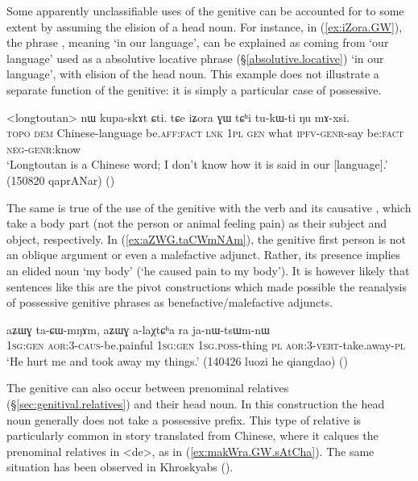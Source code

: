 Some apparently unclassifiable uses of the genitive can be accounted for to some extent by assuming the elision of a head noun.  For instance, in (\ref{ex:iZora.GW}), the phrase , meaning `in our language', can be explained as coming from  `our language' used as a absolutive locative phrase (§\ref{absolutive.locative}) `in our language', with elision of the head noun. This example does not illustrate a separate function of the genitive: it is simply a particular case of possessive.

\begin{exe}
\ex \label{ex:iZora.GW}
\gll  <longtoutan> nɯ kupa-skɤt ɕti. tɕe iʑora ɣɯ tɕʰi tu-kɯ-ti ŋu mɤ-xsi. \\
\textsc{topo} \textsc{dem} Chinese-language be.\textsc{aff}:\textsc{fact} \textsc{lnk} \textsc{1pl} \textsc{gen} what \textsc{ipfv}-\textsc{genr}-say be:\textsc{fact} \textsc{neg}-\textsc{genr}:know \\
\glt `Longtoutan is a Chinese word; I don't know how it is said in our [language].'  (150820 qaprANar)
()
\end{exe}

The same is true of the use of the genitive with the verb  and its causative , which take a body part (not the person or animal feeling pain) as their subject and object, respectively. In (\ref{ex:aZWG.taCWmNAm}), the genitive first person  is not an oblique argument or even a malefactive adjunct. Rather, its presence implies an elided noun  `my body' (`he caused pain to my body'). It is however likely that sentences like this are the pivot constructions which made possible the reanalysis of possessive genitive phrases as benefactive/malefactive adjuncts.

\begin{exe}
\ex \label{ex:aZWG.taCWmNAm}
\gll aʑɯɣ ta-ɕɯ-mŋɤm, aʑɯɣ a-laχtɕʰa ra ja-nɯ-tsɯm-nɯ \\
\textsc{1sg}:\textsc{gen} \textsc{aor}:3\flobv{}-\textsc{caus}-be.painful \textsc{1sg}:\textsc{gen} \textsc{1sg}.\textsc{poss}-thing \textsc{pl} \textsc{aor}:3\flobv{}-\textsc{vert}-take.away-\textsc{pl} \\
\glt `He hurt me and took away my things.' (140426 luozi he qiangdao) 	()
\end{exe}

The genitive can also occur between prenominal relatives (§\ref{sec:genitival.relatives}) and their head noun. In this construction the head noun generally does not take a possessive prefix. This type of relative is particularly common in story translated from Chinese, where it calques the prenominal relatives in  <de>, as in (\ref{ex:makWra.GW.sAtCha}). The same situation has been observed in Khroskyabs (\citealt[640--643]{lai17khroskyabs}).

